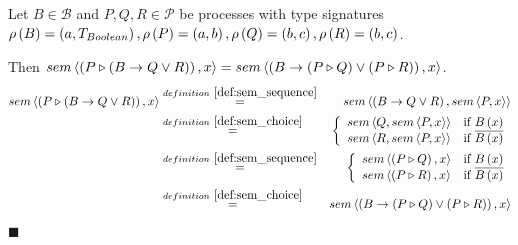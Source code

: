\begin{myproof}
Let $B \in \mathcal{B}$ and $P, Q, R \in \mathcal{P}$ be processes with type signatures $\rho \left( B \right) = \left( a, T_{Boolean} \right), \rho \left( P \right) = \left( a, b \right), \rho \left( Q \right) = \left( b, c \right), \rho \left( R \right) = \left( b, c \right)$. 

Then $sem \left\langle \left( P \triangleright \left( B \to Q \vee R \right) \right), x \right\rangle = sem \left\langle \left( B \to \left( P \triangleright Q \right) \vee \left( P \triangleright R \right) \right), x \right\rangle$.
\begin{eqnarray*}
  \sem{\sequence{P}{\choice{B}{Q}{R}}}{x} & \overset{\defref{def:sem_sequence}}{=} & \sem{\choice{B}{Q}{R}}{\sem{P}{x}} \\
                                          & \overset{\defref{def:sem_choice}}{=}   & \left\{\begin{array}{ll}
                                                                                              \sem{Q}{\sem{P}{x}} & \text{if } B \left( x \right) \\
                                                                                              \sem{R}{\sem{P}{x}} & \text{if } \overline{B \left( x \right)}
                                                                                            \end{array}
                                                                                     \right. \\
                                          & \overset{\defref{def:sem_sequence}}{=} & \left\{\begin{array}{ll}
                                                                                              \sem{\sequence{P}{Q}}{x} & \text{if } B \left( x \right) \\
                                                                                              \sem{\sequence{P}{R}}{x} & \text{if } \overline{B \left( x \right)}
                                                                                            \end{array}
                                                                                     \right. \\
                                          & \overset{\defref{def:sem_choice}}{=}   & \sem{\choice{B}{\sequence{P}{Q}}{\sequence{P}{R}}}{x}
\end{eqnarray*}


\hfill$\blacksquare$
\end{myproof}

